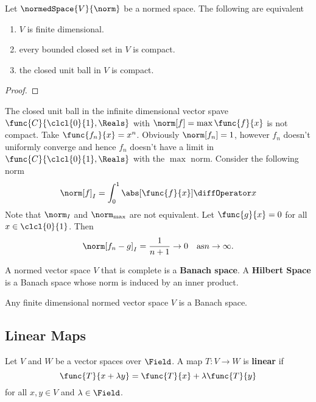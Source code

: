 \begin{theorem}
    Let \(\normedSpace{V}{\norm}\) be a normed space. The following are equivalent
    \begin{enumerate}
        \item \(V\) is finite dimensional.
        \item every bounded closed set in \(V\) is compact.
        \item the closed unit ball in \(V\) is compact.
    \end{enumerate}
\end{theorem}


\begin{proof}

\end{proof}

\begin{example}
    The closed unit ball in the infinite dimensional vector spave \(\func{C}{\clcl{0}{1},\Reals}\) with \(\norm[f] = \max \func{f}{x}\) is not compact.  Take \(\func{f_n}{x} = x^n\). Obviously \(\norm[f_n] = 1\), however \(f_n\) doesn't uniformly converge and hence \(f_n\) doesn't have a limit in \(\func{C}{\clcl{0}{1},\Reals}\) with the \(\max\) norm. Consider the following norm
    \begin{equation*}
        \norm[f]_I = \int_0^1 \abs[\func{f}{x}] \diffOperator x
    \end{equation*}
    Note that \(\norm_I\) and \(\norm_{\max} \) are not equivalent. Let \(\func{g}{x} = 0\) for all \(x \in \clcl{0}{1}\). Then
    \begin{equation*}
        \norm[f_n - g]_I = \dfrac{1}{n+1} \to 0 \quad \text{as} n \to \infty.
    \end{equation*}
\end{example}

\begin{definition}
    A normed vector space \(V\) that is complete is a \textbf{Banach space}. A \textbf{Hilbert Space} is a Banach space whose norm is induced by an inner product.
\end{definition}

\begin{corollary}
    Any finite dimensional normed vector space \(V\) is a Banach space.
\end{corollary}

\subsection{Linear Maps}
Let \(V\) and \(W\) be a vector spaces over \(\Field\). A map \(T: V \to W\) is \textbf{linear} if
\begin{equation*}
    \func{T}{x + \lambda y} = \func{T}{x} + \lambda \func{T}{y}
\end{equation*}
for all \(x,y \in V\) and \(\lambda \in \Field\).

